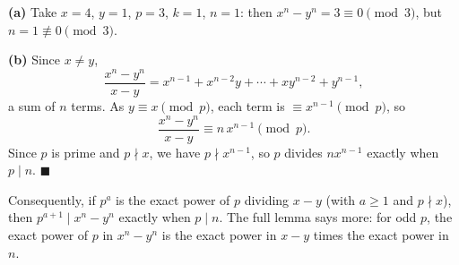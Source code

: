 \textbf{(a)} Take $x=4$, $y=1$, $p=3$, $k=1$, $n=1$: then $x^n-y^n=3\equiv0\pmod3$, but $n=1\not\equiv0\pmod3$.

\textbf{(b)} Since $x\ne y$,
\[\dfrac{x^n-y^n}{x-y}=x^{n-1}+x^{n-2}y+\cdots+xy^{n-2}+y^{n-1},\]
a sum of $n$ terms. As $y\equiv x\pmod p$, each term is $\equiv x^{n-1}\pmod p$, so
\[\dfrac{x^n-y^n}{x-y}\equiv n\,x^{n-1}\pmod p.\]
Since $p$ is prime and $p\nmid x$, we have $p\nmid x^{n-1}$, so $p$ divides $nx^{n-1}$ exactly when $p\mid n$. $\blacksquare$

Consequently, if $p^a$ is the exact power of $p$ dividing $x-y$ (with $a\ge1$ and $p\nmid x$), then $p^{a+1}\mid x^n-y^n$ exactly when $p\mid n$. The full lemma says more: for odd $p$, the exact power of $p$ in $x^n-y^n$ is the exact power in $x-y$ times the exact power in $n$.
